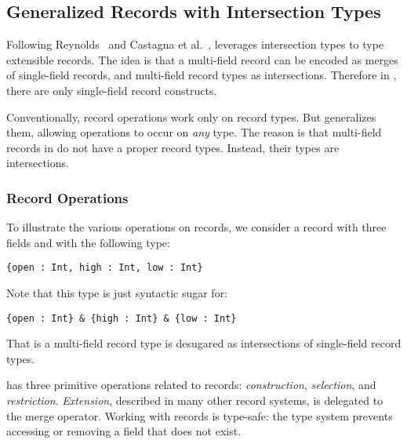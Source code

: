 

\subsection{Generalized Records with Intersection Types}

Following Reynolds~\cite{reynolds1997design} and Castagna et
al.~\cite{castagna1995calculus}, \name leverages intersection types to type
extensible records. The idea is that a multi-field record can be encoded as
merges of single-field records, and multi-field record types as intersections.
Therefore in \name, there are only single-field record constructs. 

Conventionally, record operations work only on record types. But \name
generalizes them, allowing operations to occur on \emph{any} type. The
reason is that multi-field records in \name do not have a proper
record types. Instead, their types are intersections.

\subsubsection{Record Operations}

To illustrate the various operations on records, we consider a record
with three fields and with the following type:

\begin{lstlisting}
{open : Int, high : Int, low : Int} 
\end{lstlisting}

\noindent Note that this type is just syntactic sugar for:

\begin{lstlisting}
{open : Int} & {high : Int} & {low : Int} 
\end{lstlisting}

\noindent That is a multi-field record type is desugared as
intersections of single-field record types.

\name has three primitive operations related to records: \emph{construction},
\emph{selection}, and \emph{restriction}. \emph{Extension}, described in many
other record systems, is delegated to the merge operator. Working with records
is type-safe: the type system prevents accessing or removing a field that does
not exist.

